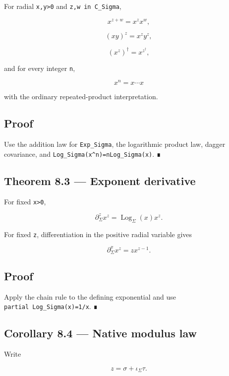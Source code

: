 For radial \texttt{x,y\textgreater{}0} and \texttt{z,w\ in\ C\_Sigma},

\[
\boxed{x^{z+w}=x^zx^w,}
\]

\[
\boxed{(xy)^z=x^zy^z,}
\]

\[
\boxed{(x^z)^\dagger=x^{z^\dagger},}
\]

and for every integer \texttt{n},

\[
\boxed{x^n=x\cdots x}
\]

with the ordinary repeated-product interpretation.

\hypertarget{proof-11}{%
\subsection{Proof}\label{proof-11}}

Use the addition law for \texttt{Exp\_Sigma}, the logarithmic product law, dagger
covariance, and \texttt{Log\_Sigma(x\^{}n)=nLog\_Sigma(x)}. ∎

\hypertarget{theorem-8.3-exponent-derivative}{%
\subsection{Theorem 8.3 --- Exponent derivative}\label{theorem-8.3-exponent-derivative}}

For fixed \texttt{x\textgreater{}0},

\[
\boxed{
\partial_\Sigma^z x^z
=
\operatorname{Log}_\Sigma(x)x^z.
}
\]

For fixed \texttt{z}, differentiation in the positive radial variable gives

\[
\boxed{
\partial_\Sigma^x x^z
=z x^{z-1}.
}
\]

\hypertarget{proof-12}{%
\subsection{Proof}\label{proof-12}}

Apply the chain rule to the defining exponential and use
\texttt{partial\ Log\_Sigma(x)=1/x}. ∎

\hypertarget{corollary-8.4-native-modulus-law}{%
\subsection{Corollary 8.4 --- Native modulus law}\label{corollary-8.4-native-modulus-law}}

Write

\[
z=\sigma+\iota_\Sigma\tau.
\]


